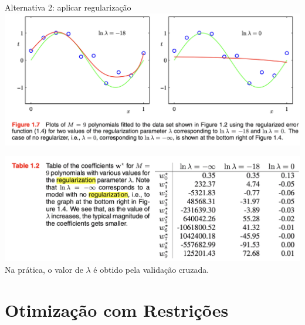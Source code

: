 \documentclass{beamer}
\begin{document}
\begin{frame}{Alternativa 2: aplicar regularização}
\centering
\includegraphics[width=\textwidth,height=0.8\textheight,keepaspectratio]{imgs/bishop_example/4.png}
\end{frame}

\begin{frame}
\centering
\includegraphics[width=\textwidth,height=0.8\textheight,keepaspectratio]{imgs/bishop_example/5.png}
\footnotesize{Na prática, o valor de $\lambda$ é obtido pela validação cruzada.}
\end{frame}

\section{Otimização com Restrições}
\end{document}

